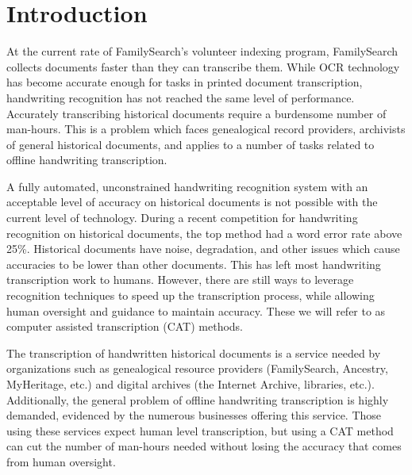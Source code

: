 \documentclass[ms]{byuprop}
\title{\Title}
\author{\Author}
\begin{document}
\maketitle

\section{Introduction}
At the current rate of FamilySearch's volunteer indexing program, FamilySearch collects documents faster than they can transcribe them. While OCR technology has become accurate enough for tasks in printed document transcription, handwriting recognition has not reached the same level of performance. Accurately transcribing historical documents require a burdensome number of man-hours. This is a problem which faces genealogical record providers, archivists of general historical documents, and applies to a number of tasks related to offline handwriting transcription.

A fully automated, unconstrained handwriting recognition system with an acceptable level of accuracy on historical documents is not possible with the current level of technology. During a recent competition for handwriting recognition on historical documents, the top method had a word error rate above 25\%\cite{icdarComp2015}.  Historical documents have noise, degradation, and other issues which cause accuracies to be lower than other documents. This has left most handwriting transcription work to humans. However, there are still ways to leverage recognition techniques to speed up the transcription process, while allowing human oversight and guidance to maintain accuracy. These we will refer to as computer assisted transcription (CAT) methods.

The transcription of handwritten historical documents is a service needed by organizations such as genealogical resource providers (FamilySearch, Ancestry, MyHeritage, etc.) and digital archives (the Internet Archive, libraries, etc.). Additionally, the general problem of offline handwriting transcription is highly demanded, evidenced by the numerous businesses offering this service. Those using these services expect human level transcription, but using a CAT method can cut the number of man-hours needed without losing the accuracy that comes from human oversight.
\end{document}
